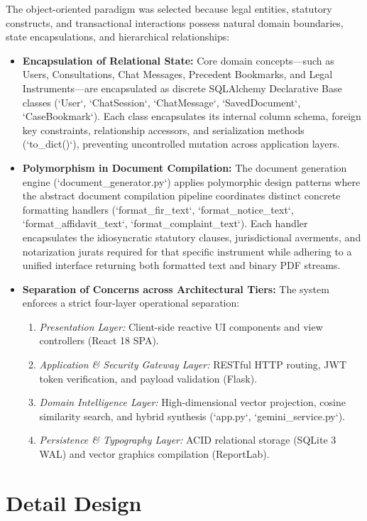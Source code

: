 The object-oriented paradigm was selected because legal entities, statutory constructs, and transactional interactions possess natural domain boundaries, state encapsulations, and hierarchical relationships:
\begin{itemize}
    \item \textbf{Encapsulation of Relational State:} Core domain concepts---such as Users, Consultations, Chat Messages, Precedent Bookmarks, and Legal Instruments---are encapsulated as discrete SQLAlchemy Declarative Base classes (`User`, `ChatSession`, `ChatMessage`, `SavedDocument`, `CaseBookmark`). Each class encapsulates its internal column schema, foreign key constraints, relationship accessors, and serialization methods (`to_dict()`), preventing uncontrolled mutation across application layers.
    \item \textbf{Polymorphism in Document Compilation:} The document generation engine (`document_generator.py`) applies polymorphic design patterns where the abstract document compilation pipeline coordinates distinct concrete formatting handlers (`format_fir_text`, `format_notice_text`, `format_affidavit_text`, `format_complaint_text`). Each handler encapsulates the idiosyncratic statutory clauses, jurisdictional averments, and notarization jurats required for that specific instrument while adhering to a unified interface returning both formatted text and binary PDF streams.
    \item \textbf{Separation of Concerns across Architectural Tiers:} The system enforces a strict four-layer operational separation:
    \begin{enumerate}
        \item \textit{Presentation Layer:} Client-side reactive UI components and view controllers (React 18 SPA).
        \item \textit{Application \& Security Gateway Layer:} RESTful HTTP routing, JWT token verification, and payload validation (Flask).
        \item \textit{Domain Intelligence Layer:} High-dimensional vector projection, cosine similarity search, and hybrid synthesis (`app.py`, `gemini_service.py`).
        \item \textit{Persistence \& Typography Layer:} ACID relational storage (SQLite 3 WAL) and vector graphics compilation (ReportLab).
    \end{enumerate}
\end{itemize}

\section{Detail Design}
\label{sec:detail_design}

